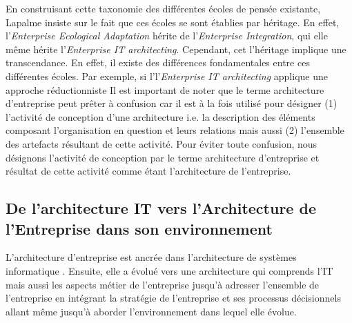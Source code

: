 %
%
%
%

En construisant cette taxonomie des différentes écoles de pensée existante, Lapalme insiste sur le fait que ces écoles se sont établies par héritage. En effet, l'\textit{Enterprise Ecological Adaptation} hérite de l'\textit{Enterprise Integration}, qui elle même hérite l'\textit{Enterprise IT architecting}. Cependant, cet l'héritage implique une transcendance. En effet, il existe des différences fondamentales entre ces différentes écoles. Par exemple, si l'l'\textit{Enterprise IT architecting} applique une approche réductionniste 
Il est important de noter que le terme architecture d'entreprise peut prêter à confusion car il est à la fois utilisé pour désigner (1) l'activité de conception d'une architecture i.e. la description des éléments composant l'organisation en question et leurs relations mais aussi (2) l'ensemble des artefacts résultant de cette activité. 
Pour éviter toute confusion, nous désignons l'activité de conception par le terme architecture d'entreprise et résultat de cette activité comme étant l'architecture de l'entreprise.



\subsection{De l'architecture IT vers l'Architecture de l'Entreprise dans son environnement}

L'architecture d'entreprise est ancrée dans l'architecture de systèmes 
informatique \cite{kappelman2008enterprise}. Ensuite, elle a évolué vers une 
architecture qui comprends l'IT mais aussi les aspects métier de l'entreprise 
\cite{winter2006essential}  jusqu'à adresser l'ensemble de l'entreprise en 
intégrant la stratégie de l'entreprise et ses processus décisionnels 
\cite{ross2006enterprise} allant même jusqu'à aborder l'environnement dans 
lequel elle évolue.

